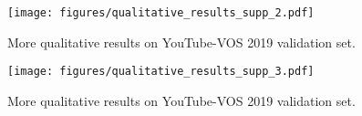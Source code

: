 \begin{figure*}[t]
\centering
\texttt{[image: figures/qualitative\_results\_supp\_2.pdf]}
\caption{More qualitative results on YouTube-VOS 2019 validation set.
}
\label{fig:qualitative_results_2}
\end{figure*}

\begin{figure*}[t]
\centering
\texttt{[image: figures/qualitative\_results\_supp\_3.pdf]}
\caption{More qualitative results on YouTube-VOS 2019 validation set.
}
\label{fig:qualitative_results_3}
\end{figure*}

{\small
}

